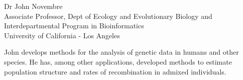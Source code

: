 {\color{section0}Dr John Novembre\\
Associate Professor, Dept of Ecology and Evolutionary Biology and\\
Interdepartmental Program in Bioinformatics\\
University of California - Los Angeles}

John develops methods for the analysis of genetic data in humans and
other species. He has, among other applications, developed methods to estimate population structure and rates of recombination in admixed individuals.  

